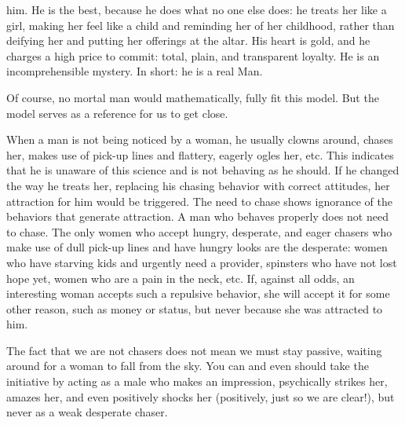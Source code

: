 him. He is the best, because he does what no one else does: he treats her like a girl, making her feel like a child and reminding her of her childhood, rather than deifying her and putting her offerings at the altar. His heart is gold, and he charges a high price to commit: total, plain, and transparent loyalty. He is an incomprehensible mystery. In short: he is a real Man.

\par Of course, no mortal man would mathematically, fully fit this model. But the model serves as a reference for us to get close.

\par When a man is not being noticed by a woman, he usually clowns around, chases her, makes use of pick-up lines and flattery, eagerly ogles her, etc. This indicates that he is unaware of this science and is not behaving as he should. If he changed the way he treats her, replacing his chasing behavior with correct attitudes, her attraction for him would be triggered. The need to chase shows ignorance of the behaviors that generate attraction. A man who behaves properly does not need to chase. The only women who accept hungry, desperate, and eager chasers who make use of dull pick-up lines and have hungry looks are the desperate: women who have starving kids and urgently need a provider, spinsters who have not lost hope yet, women who are a pain in the neck, etc. If, against all odds, an interesting woman accepts such a repulsive behavior, she will accept it for some other reason, such as money or status, but never because she was attracted to him.

\par The fact that we are not chasers does not mean we must stay passive, waiting around for a woman to fall from the sky. You can and even should take the initiative by acting as a male who makes an impression, psychically strikes her, amazes her, and even positively shocks her (positively, just so we are clear!), but never as a weak desperate chaser.

